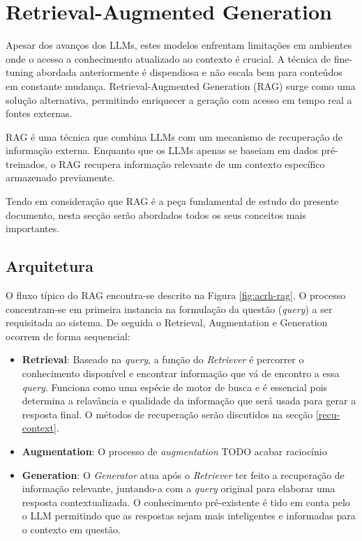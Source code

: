 \section{Retrieval-Augmented Generation}

Apesar dos avanços dos LLMs, estes modelos enfrentam limitações em ambientes onde o acesso a conhecimento atualizado ao contexto é crucial. A técnica de fine-tuning abordada anteriormente é dispendiosa e não escala bem para conteúdos em constante mudança. Retrieval-Augmented Generation (RAG) surge como uma solução alternativa, permitindo enriquecer a geração com acesso em tempo real a fontes externas.

RAG é uma técnica que combina LLMs com um mecanismo de recuperação de informação externa. Enquanto que os LLMs apenas se baseiam em dados pré-treinados, o RAG recupera informação relevante de um contexto específico armazenado previamente.

Tendo em consideração que RAG é a peça fundamental de estudo do presente documento, nesta secção serão abordados todos os seus conceitos mais importantes.

\subsection{Arquitetura}


O fluxo típico do RAG encontra-se descrito na Figura \ref{fig:acrh-rag}. O processo concentram-se em primeira instancia na formulação da questão (\textit{query}) a ser requisitada ao sistema. De seguida o Retrieval, Augmentation e Generation ocorrem de forma sequencial: 


\begin{itemize}
    \item \textbf{Retrieval}: Baseado na \textit{query}, a função do \textit{Retriever} é percorrer o conhecimento disponível e encontrar informação que vá de encontro a essa \textit{query}. Funciona como uma espécie de motor de busca e é essencial pois determina a relavância e qualidade da informação que será usada para gerar a resposta final. O métodos de recuperação serão discutidos na secção \ref{recu-context}.
    \item \textbf{Augmentation}: O processo de \textit{augmentation} TODO acabar raciocínio
    \item \textbf{Generation}: O \textit{Generator} atua após o \textit{Retriever} ter feito a recuperação de informação relevante, juntando-a com a \textit{query} original para elaborar uma resposta contextualizada. O conhecimento pré-existente é tido em conta pelo o LLM permitindo que as respostas sejam mais inteligentes e informadas para o contexto em questão. 
\end{itemize}


